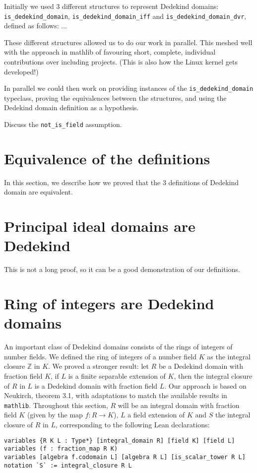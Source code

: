\documentclass{lipics-v2021}
\newcommand{\lean}[1]{\texttt{#1}\xspace} %
\newcommand{\mathlib}{\texttt{mathlib}\xspace}
\newcommand{\Z}{\mathbb{Z}}
\begin{document}
Initially we used 3 different structures to represent Dedekind domains: \lean{is\_dedekind\_domain}, \lean{is\_dedekind\_domain\_iff} and \lean{is\_dedekind\_domain\_dvr}, defined as follows:
...

These different structures allowed us to do our work in parallel. This meshed well with the approach in mathlib of favouring short, complete, individual contributions over including projects. (This is also how the Linux kernel gets developed!)

In parallel we could then work on providing instances of the \lean{is\_dedekind\_domain} typeclass, proving the equivalences between the structures, and using the Dedekind domain definition as a hypothesis.

Discuss the \lean{not\_is\_field} assumption.

\section{Equivalence of the definitions}

In this section, we describe how we proved that the 3 definitions of Dedekind domain are equivalent.

\section{Principal ideal domains are Dedekind}

This is not a long proof, so it can be a good demonstration of our definitions.

\section{Ring of integers are Dedekind domains}

An important class of Dedekind domains consists of the rings of integers of number fields.
We defined the ring of integers of a number field $K$ as the integral closure $\Z$ in $K$.
We proved a stronger result: let $R$ be a Dedekind domain with fraction field $K$, if $L$ is a finite separable extension of $K$, then the integral closure of $R$ in $L$ is a Dedekind domain with fraction field $L$.
Our approach is based on Neukirch, theorem 3.1, with adaptations to match the available results in \mathlib. %
Throughout this section, $R$ will be an integral domain with fraction field $K$ (given by the map $f : R \to K$), $L$ a field extension of $K$ and $S$ the integral closure of $R$ in $L$,
corresponding to the following Lean declarations:
\begin{lstlisting}
variables {R K L : Type*} [integral_domain R] [field K] [field L]
variables (f : fraction_map R K)
variables [algebra f.codomain L] [algebra R L] [is_scalar_tower R L]
notation `S` := integral_closure R L
\end{lstlisting}
\end{document}
